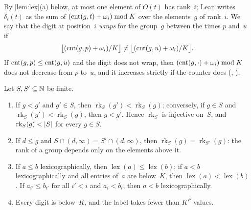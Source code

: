 By \cref{lem:lex}(a) below, at most one element of $O(t)$ has rank~$i$; Lean writes $\delta_i(t)$ as the sum of
$(\mathrm{cnt}(g,t)+\omega_i)\bmod K$ over the elements~$g$ of rank~$i$. We say that the digit at position~$i$ \emph{wraps} for the
group~$g$ between the times $p$ and~$u$ if
\[
  \bigl\lfloor(\mathrm{cnt}(g,p)+\omega_i)/K\bigr\rfloor\ne\bigl\lfloor(\mathrm{cnt}(g,u)+\omega_i)/K\bigr\rfloor .
\]
If $\mathrm{cnt}(g,p)\le\mathrm{cnt}(g,u)$ and the digit does not wrap, then $(\mathrm{cnt}(g,\cdot)+\omega_i)\bmod K$ does not decrease from $p$ to~$u$,
and it increases strictly if the counter does (,
).

\begin{lemma}\label{lem:lex}
Let $S,S'\subseteq\mathbb{N}$ be finite.
\begin{enumerate}[label=(\alph*)]
\item If $g<g'$ and $g'\in S$, then $\operatorname{rk}_S(g')<\operatorname{rk}_S(g)$; conversely, if $g\in S$ and
$\operatorname{rk}_S(g')<\operatorname{rk}_S(g)$, then $g<g'$. Hence $\operatorname{rk}_S$ is injective on~$S$, and
$\operatorname{rk}_S(g)<\lvert S \rvert$ for every $g\in S$.
\item If $d\le g$ and $S\cap(d,\infty)=S'\cap(d,\infty)$, then $\operatorname{rk}_S(g)=\operatorname{rk}_{S'}(g)$: the rank of a group
depends only on the elements above it.
\item If $a\le b$ lexicographically, then $\operatorname{lex}(a)\le\operatorname{lex}(b)$; if $a<b$ lexicographically and all
entries of~$a$ are below~$K$, then $\operatorname{lex}(a)<\operatorname{lex}(b)$. If $a_{i'}\le b_{i'}$ for all $i'<i$ and
$a_i<b_i$, then $a<b$ lexicographically.
\item Every digit is below~$K$, and the label takes fewer than $K^P$ values.
\end{enumerate}
\end{lemma}

